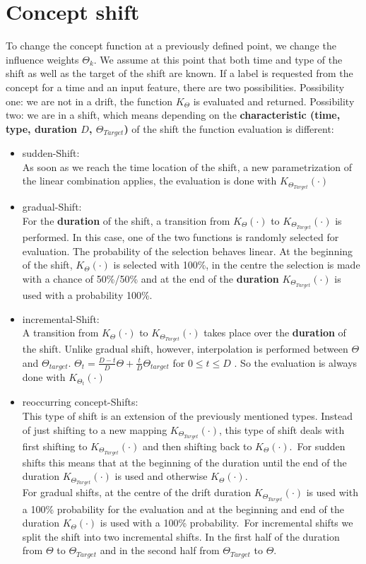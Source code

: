 \documentclass[12pt,a4paper,oneside,ngerman]{article}
\theoremstyle{plain}
\begin{document}
	\section{Concept shift}
	\label{sec:Conceptshift}
	To change the concept function at a previously defined point, we change the influence weights $\Theta_k$. We assume at this point that both time and type of the shift as well as the target of the shift are known.
	If a label is requested from the concept for a time and an input feature, there are two possibilities.
	Possibility one: we are not in a drift, the function $K_\Theta$ is evaluated and returned.
	Possibility two: we are in a shift, which means depending on the \textbf{characteristic (time, type, duration $D$, $\Theta_{Target}$)} of the shift the function evaluation is different:
	\begin{itemize}
		\item sudden-Shift:\\
			As soon as we reach the time location of the shift, a new parametrization of the linear combination applies, the evaluation is done with $K_{\Theta_{Target}}(\cdot)$
		\item gradual-Shift:\\
			For the \textbf{duration} of the shift, a transition from $K_{\Theta}(\cdot)$ to $K_{\Theta_{Target}}(\cdot)$ is performed. In this case, one of the two functions is randomly selected for evaluation. The probability of the selection behaves linear. At the beginning of the shift, $K_{\Theta}(\cdot)$ is selected with 100\%, in the centre the selection is made with a chance of 50\%/50\% and at the end of the \textbf{duration} $K_{\Theta_{Target}}(\cdot)$ is used with a probability 100\%.
		\item incremental-Shift:\\
			A transition from $K_{\Theta}(\cdot)$ to $K_{\Theta_{Target}}(\cdot)$ takes place over the \textbf{duration} of the shift. Unlike gradual shift, however, interpolation is performed between $\Theta$ and $\Theta_{target}$. $\Theta_{t} = \frac{D-t}{D}\Theta+\frac{t}{D}\Theta_{target}$ for $0\leq t \leq D$ . So the evaluation is always done with $K_{\Theta_{t}}(\cdot)$
		\item reoccurring concept-Shifts:\\
			This type of shift is an extension of the previously mentioned types.
			Instead of just shifting to a new mapping $K_{\Theta_{Target}}(\cdot)$, this type of shift deals with first shifting to $K_{\Theta_{Target}}(\cdot)$ and then shifting back to $K_{\Theta}(\cdot)$.\
			For sudden shifts this means that at the beginning of the duration until the end of the duration $K_{\Theta_{Target}}(\cdot)$ is used and otherwise $K_{\Theta}(\cdot)$.\\
			For gradual shifts, at the centre of the drift duration $K_{\Theta_{Target}}(\cdot)$ is used with a 100\% probability for the evaluation and at the beginning and end of the duration $K_{\Theta}(\cdot)$ is used with a 100\% probability.\
			For incremental shifts we split the shift into two incremental shifts. In the first half of the duration from $\Theta$ to $\Theta_{Target}$ and in the second half from $\Theta_{Target}$ to $\Theta$.
	\end{itemize}
\end{document}
